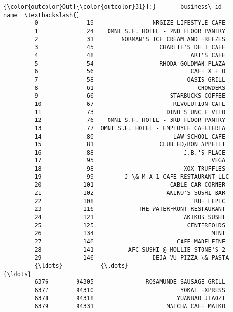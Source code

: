 \documentclass[11pt]{article}
\begin{document}
\begin{Verbatim}[commandchars=\\\{\}]
{\color{outcolor}Out[{\color{outcolor}31}]:}       business\_id                                  name  \textbackslash{}
         0              19                 NRGIZE LIFESTYLE CAFE   
         1              24    OMNI S.F. HOTEL - 2ND FLOOR PANTRY   
         2              31        NORMAN'S ICE CREAM AND FREEZES   
         3              45                   CHARLIE'S DELI CAFE   
         4              48                            ART'S CAFE   
         5              54                   RHODA GOLDMAN PLAZA   
         6              56                            CAFE X + O   
         7              58                           OASIS GRILL   
         8              61                              CHOWDERS   
         9              66                      STARBUCKS COFFEE   
         10             67                       REVOLUTION CAFE   
         11             73                     DINO'S UNCLE VITO   
         12             76    OMNI S.F. HOTEL - 3RD FLOOR PANTRY   
         13             77  OMNI S.F. HOTEL - EMPLOYEE CAFETERIA   
         14             80                       LAW SCHOOL CAFE   
         15             81                   CLUB ED/BON APPETIT   
         16             88                          J.B.'S PLACE   
         17             95                                  VEGA   
         18             98                          XOX TRUFFLES   
         19             99         J \& M A-1 CAFE RESTAURANT LLC   
         20            101                      CABLE CAR CORNER   
         21            102                     AKIKO'S SUSHI BAR   
         22            108                             RUE LEPIC   
         23            116             THE WATERFRONT RESTAURANT   
         24            121                          AKIKOS SUSHI   
         25            125                           CENTERFOLDS   
         26            134                                  MINT   
         27            140                        CAFE MADELEINE   
         28            141          AFC SUSHI @ MOLLIE STONE'S 2   
         29            146                 DEJA VU PIZZA \& PASTA   
         {\ldots}           {\ldots}                                   {\ldots}   
         6376        94305               ROSAMUNDE SAUSAGE GRILL   
         6377        94310                         YOKAI EXPRESS   
         6378        94318                        YUANBAO JIAOZI   
         6379        94331                     MATCHA CAFE MAIKO   

\end{Verbatim}
\end{document}
